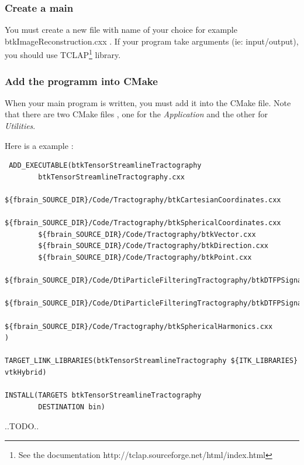 \subsubsection{Create a main}
You must create a new file with name of your choice for example btkImageReconstruction.cxx .
If your program take arguments (ie: input/output), you should use TCLAP\footnote{See the documentation http://tclap.sourceforge.net/html/index.html } library.
\subsubsection{Add the programm into CMake}
When your main program is written, you must add it into the CMake file.
Note that there are two CMake files , one for the \textit{Application} and the other for \textit{Utilities}.

Here is a example :
\begin{verbatim}
 ADD_EXECUTABLE(btkTensorStreamlineTractography
        btkTensorStreamlineTractography.cxx
        ${fbrain_SOURCE_DIR}/Code/Tractography/btkCartesianCoordinates.cxx
        ${fbrain_SOURCE_DIR}/Code/Tractography/btkSphericalCoordinates.cxx
        ${fbrain_SOURCE_DIR}/Code/Tractography/btkVector.cxx
        ${fbrain_SOURCE_DIR}/Code/Tractography/btkDirection.cxx
        ${fbrain_SOURCE_DIR}/Code/Tractography/btkPoint.cxx
        ${fbrain_SOURCE_DIR}/Code/DtiParticleFilteringTractography/btkDTFPSignalExtractor.cxx
        ${fbrain_SOURCE_DIR}/Code/DtiParticleFilteringTractography/btkDTFPSignal.cxx
        ${fbrain_SOURCE_DIR}/Code/Tractography/btkSphericalHarmonics.cxx
)

TARGET_LINK_LIBRARIES(btkTensorStreamlineTractography ${ITK_LIBRARIES} vtkHybrid)

INSTALL(TARGETS btkTensorStreamlineTractography
        DESTINATION bin)
\end{verbatim}


..TODO..
